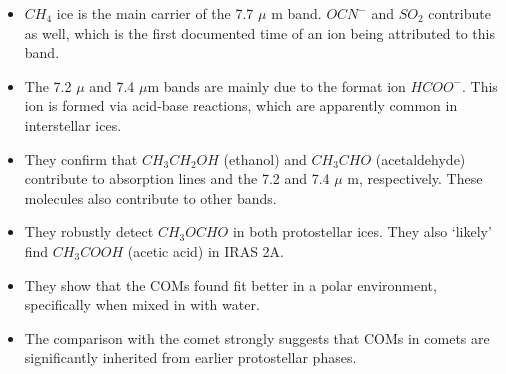 \documentclass[svgnames]{article}     %
\begin{document}
\begin{itemize}
  \item[-] $CH_4$ ice is the main carrier of the 7.7 $\mu$ m band. $OCN^-$ and
    $SO_2$ contribute as well, which is the first documented time of an ion
    being attributed to this band. 
  \item[-] The 7.2 $\mu$ and 7.4 $\mu$m bands are mainly due to the format ion
    $HCOO^-$. This ion is formed via acid-base reactions, which are apparently
    common in interstellar ices. 
  \item[-] They confirm that $CH_3CH_2OH$ (ethanol) and $CH_3CHO$ (acetaldehyde)
    contribute to absorption lines and the 7.2 and 7.4 $\mu$ m, respectively.
    These molecules also contribute to other bands. 
  \item[-] They robustly detect $CH_3OCHO$ in both protostellar ices. They also
    `likely' find $CH_3COOH$ (acetic acid) in IRAS 2A. 
  \item[-] They show that the COMs found fit better in a polar environment,
    specifically when mixed in with water. 
  \item[-] The comparison with the comet strongly suggests that COMs in comets are
    significantly inherited from earlier protostellar phases. 
\end{itemize}
\end{document}

